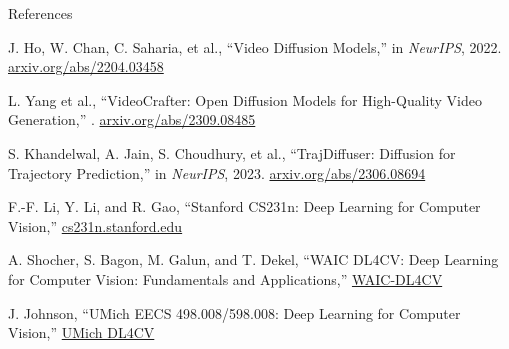 \begin{frame}[allowframebreaks]{References}
\begin{thebibliography}{13}
        J. Ho, W. Chan, C. Saharia, et al.,
        \newblock ``Video Diffusion Models,''
        \newblock in \emph{NeurIPS}, 2022.
        \newblock \href{https://arxiv.org/abs/2204.03458}{arxiv.org/abs/2204.03458}

        L. Yang et al.,
        \newblock ``VideoCrafter: Open Diffusion Models for High-Quality Video Generation,''
        .
        \newblock \href{https://arxiv.org/abs/2309.08485}{arxiv.org/abs/2309.08485}

        S. Khandelwal, A. Jain, S. Choudhury, et al.,
        \newblock ``TrajDiffuser: Diffusion for Trajectory Prediction,''
        \newblock in \emph{NeurIPS}, 2023.
        \newblock \href{https://arxiv.org/abs/2306.08694}{arxiv.org/abs/2306.08694}

        F.-F. Li, Y. Li, and R. Gao,
        \newblock ``Stanford CS231n: Deep Learning for Computer Vision,'' 
        \newblock \href{https://cs231n.stanford.edu/}{cs231n.stanford.edu}

        A. Shocher, S. Bagon, M. Galun, and T. Dekel,
        \newblock ``WAIC DL4CV: Deep Learning for Computer Vision: Fundamentals and Applications,''
        \newblock \href{https://www.cs.tau.ac.il/~assafshocher/WAIC-DL4CV/}{WAIC-DL4CV}

        J. Johnson,
        \newblock ``UMich EECS 498.008/598.008: Deep Learning for Computer Vision,''
        \newblock \href{https://web.eecs.umich.edu/~justincj/teaching/eecs498/WI2024/}{UMich DL4CV}
    \end{thebibliography}
\end{frame}